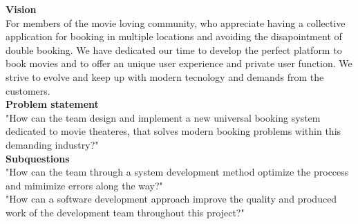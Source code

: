 \textbf{Vision} \\
For members of the movie loving community, who appreciate having a collective application for booking 
in multiple locations and avoiding the disapointment of double booking. We have dedicated our 
time to develop the perfect platform to book movies and to offer an unique user experience and private user function. 
We strive to evolve and keep up with modern tecnology and demands from the customers. \\

\textbf{Problem statement} \\
"How can the team design and implement a new universal booking system dedicated to movie theateres, 
that solves modern booking problems within this demanding industry?" \\

\textbf{Subquestions} \\
"How can the team through a system development method optimize the proccess and mimimize errors along the way?" \\

"How can a software development approach improve the quality and produced work of the development team throughout this project?"




